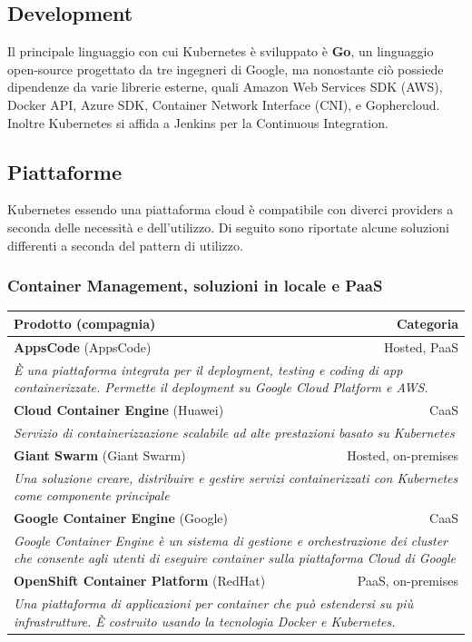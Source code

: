 \documentclass[12pt, a4paper]{report}
\begin{document}
\subsection{Development}
Il principale linguaggio con cui Kubernetes è sviluppato è \textbf{Go}, un linguaggio open-source progettato da tre ingegneri di Google, ma nonostante ciò possiede dipendenze da varie librerie esterne, quali Amazon Web Services SDK (AWS), Docker API, Azure SDK,  Container Network Interface (CNI), e Gophercloud. Inoltre Kubernetes si affida a Jenkins per la Continuous Integration.
\subsection{Piattaforme}
Kubernetes essendo una piattaforma cloud è compatibile con diverci providers a seconda delle necessità e dell'utilizzo. Di seguito sono riportate alcune soluzioni differenti a seconda del pattern di utilizzo.
\subsubsection{Container Management, soluzioni in locale e PaaS}
\begin{table}[ht]
  \small
  \begin{center}
  \begin{tabularx}{\textwidth}{|lr|}
    \hline
    \textbf{Prodotto} (compagnia) & \textbf{Categoria}\\
    \hline
    \textbf{AppsCode} (AppsCode)&Hosted, PaaS\\
    \multicolumn{2}{|X|}{\textit{È una piattaforma integrata per il deployment, testing e coding di app containerizzate. Permette il deployment su Google Cloud Platform e AWS.}}\\
    \hline
    \textbf{Cloud Container Engine} (Huawei)&CaaS\\
    \multicolumn{2}{|X|}{\textit{Servizio di containerizzazione scalabile ad alte prestazioni basato su Kubernetes}}\\
    \hline
    \textbf{Giant Swarm} (Giant Swarm)&Hosted, on-premises\\
    \multicolumn{2}{|X|}{\textit{Una soluzione creare, distribuire e gestire servizi containerizzati con Kubernetes come componente principale}}\\
    \hline
    \textbf{Google Container Engine} (Google)&CaaS\\
    \multicolumn{2}{|X|}{\textit{Google Container Engine è un sistema di gestione e orchestrazione dei cluster che consente agli utenti di eseguire container sulla piattaforma Cloud di Google}}\\
    \hline
    \textbf{OpenShift Container Platform} (RedHat)&PaaS, on-premises\\
    \multicolumn{2}{|X|}{\textit{Una piattaforma di applicazioni per container che può estendersi su più infrastrutture. È costruito usando la tecnologia Docker e Kubernetes.}}\\
    \hline
  \end{tabularx}
  \end{center}
\end{table}
\end{document}
